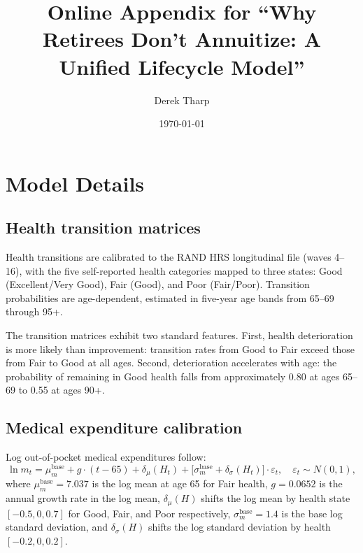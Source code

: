 \documentclass[12pt]{article}
\title{Online Appendix for ``Why Retirees Don't Annuitize: A Unified Lifecycle Model''}
\author{Derek Tharp}
\date{\today}
\begin{document}
\maketitle

\appendix
\setcounter{section}{0}
\renewcommand{\thesection}{\Alph{section}}


\section{Model Details}
\label{app:model}

\subsection{Health transition matrices}
\label{app:health_transitions}

Health transitions are calibrated to the RAND HRS longitudinal file (waves 4--16), with the five self-reported health categories mapped to three states: Good (Excellent/Very Good), Fair (Good), and Poor (Fair/Poor). Transition probabilities are age-dependent, estimated in five-year age bands from 65--69 through 95+.

The transition matrices exhibit two standard features. First, health deterioration is more likely than improvement: transition rates from Good to Fair exceed those from Fair to Good at all ages. Second, deterioration accelerates with age: the probability of remaining in Good health falls from approximately 0.80 at ages 65--69 to 0.55 at ages 90+.

\subsection{Medical expenditure calibration}

Log out-of-pocket medical expenditures follow:
\[
\ln m_t = \mu_m^{\text{base}} + g \cdot (t - 65) + \delta_\mu(H_t) + \big[\sigma_m^{\text{base}} + \delta_\sigma(H_t)\big] \cdot \varepsilon_t, \quad \varepsilon_t \sim N(0,1),
\]
where $\mu_m^{\text{base}} = 7.037$ is the log mean at age 65 for Fair health, $g = 0.0652$ is the annual growth rate in the log mean, $\delta_\mu(H)$ shifts the log mean by health state $[-0.5, 0, 0.7]$ for Good, Fair, and Poor respectively, $\sigma_m^{\text{base}} = 1.4$ is the base log standard deviation, and $\delta_\sigma(H)$ shifts the log standard deviation by health $[-0.2, 0, 0.2]$.
\end{document}
